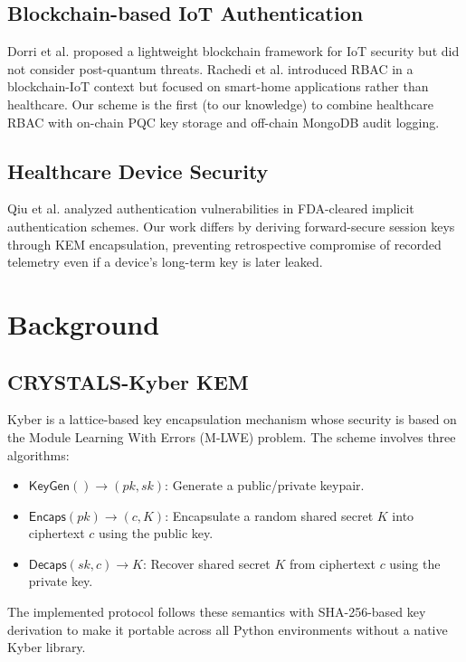 \documentclass[conference]{IEEEtran}
\begin{document}
\subsection{Blockchain-based IoT Authentication}
Dorri et al. \cite{blockchain_iomt} proposed a lightweight blockchain framework for IoT
security but did not consider post-quantum threats. Rachedi et al. \cite{rbac_iomt}
introduced RBAC in a blockchain-IoT context but focused on smart-home applications
rather than healthcare. Our scheme is the first (to our knowledge) to combine healthcare
RBAC with on-chain PQC key storage and off-chain MongoDB audit logging.

\subsection{Healthcare Device Security}
Qiu et al. \cite{healthcare_auth} analyzed authentication vulnerabilities in FDA-cleared
implicit authentication schemes. Our work differs by deriving forward-secure session
keys through KEM encapsulation, preventing retrospective compromise of recorded
telemetry even if a device's long-term key is later leaked.

\section{Background}
\label{sec:background}

\subsection{CRYSTALS-Kyber KEM}
Kyber \cite{nist_pqc} is a lattice-based key encapsulation mechanism whose security
is based on the Module Learning With Errors (M-LWE) problem. The scheme involves three
algorithms:
\begin{itemize}
  \item $\textsf{KeyGen}() \to (\mathit{pk}, \mathit{sk})$: Generate a public/private
        keypair.
  \item $\textsf{Encaps}(\mathit{pk}) \to (c, K)$: Encapsulate a random shared secret
        $K$ into ciphertext $c$ using the public key.
  \item $\textsf{Decaps}(\mathit{sk}, c) \to K$: Recover shared secret $K$ from
        ciphertext $c$ using the private key.
\end{itemize}
The implemented protocol follows these semantics with SHA-256-based key derivation to
make it portable across all Python environments without a native Kyber library.
\end{document}
